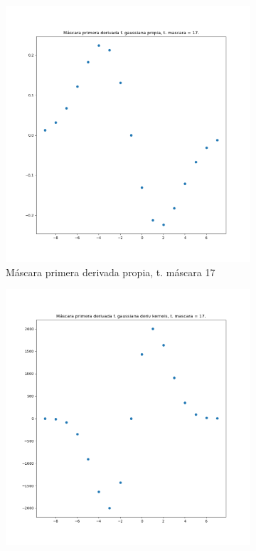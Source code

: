 \documentclass[12pt, spanish]{article}
\begin{document}
\begin{figure}[H]
  	\label{fig:ej1c5}
\end{figure}



\begin{figure}[H]
  \centering
	\begin{subfigure}[t]{0.4\textwidth}
		\centering
		\includegraphics[width = \textwidth]{cmp-p17.png}
 		 \caption{Máscara primera derivada propia, t. máscara 17}
	\end{subfigure}
	\hspace{1cm}
	\begin{subfigure}[t]{0.4\textwidth}
		\centering
		\includegraphics[width = \textwidth]{cmp-cv17.png}

\end{subfigure}
\end{figure}
\end{document}
